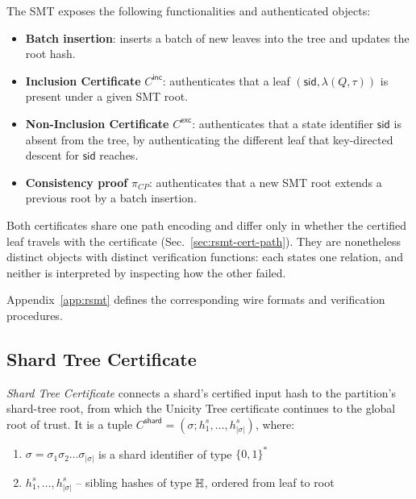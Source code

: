 The SMT exposes the following functionalities and authenticated objects:
\begin{itemize}
	\item \textbf{Batch insertion}: inserts a batch of new leaves into the tree and updates the root hash.
	\item \textbf{Inclusion Certificate} $C^\mathsf{inc}$: authenticates that a leaf $(\mathsf{sid}, \lambda(Q,\tau))$ is present under a given SMT root.
	\item \textbf{Non-Inclusion Certificate} $C^\mathsf{exc}$: authenticates that a state identifier $\mathsf{sid}$ is absent from the tree, by authenticating the different leaf that key-directed descent for $\mathsf{sid}$ reaches.
	\item \textbf{Consistency proof} $\pi_{CP}$: authenticates that a new SMT root extends a previous root by a batch insertion.
\end{itemize}

Both certificates share one path encoding and differ only in whether the certified leaf travels with the certificate (Sec.~\ref{sec:rsmt-cert-path}). They are nonetheless distinct objects with distinct verification functions: each states one relation, and neither is interpreted by inspecting how the other failed.

Appendix~\ref{app:rsmt} defines the corresponding wire formats and verification procedures.

\subsection{Shard Tree Certificate}\label{se:shard-tree-cert}

\emph{Shard Tree Certificate} connects a shard's certified input hash to the partition's shard-tree root, from which the Unicity Tree certificate continues to the global root of trust. It is a tuple $C^\mathsf{shard} = (\sigma; h^s_1, \ldots, h^s_{|\sigma|})$, where:
\begin{enumerate}
	\item $\sigma=\sigma_1\sigma_2\ldots \sigma_{|\sigma|}$ is a shard identifier of type $\{0,1\}^\ast$
	\item $h^s_1, \ldots, h^s_{|\sigma|}$ -- sibling hashes of type $\mathbb{H}$, ordered from leaf to root
\end{enumerate}

